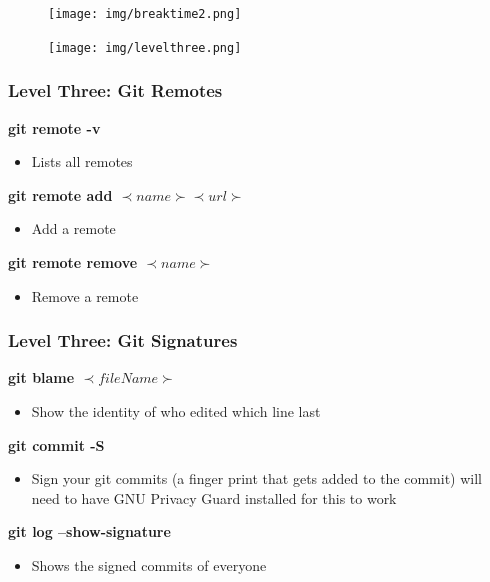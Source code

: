 \documentclass{beamer}
\begin{document}
\begin{frame}
	\begin{figure}[h]
	\centering
	\texttt{[image: img/breaktime2.png]} 
	\end{figure}
\end{frame}

\begin{frame}
	\begin{figure}[h]
	\centering
	\texttt{[image: img/levelthree.png]} 
	\end{figure}
\end{frame}

\begin{frame}
	\frametitle{\textbf{Level Three: Git Remotes}}
	
	
	\textbf{git remote -v}
	\begin{itemize}
	\item Lists all remotes 
	\end{itemize}
	\vspace{0.25cm}

	\textbf{git remote add \(\prec name \succ  \prec url \succ\)}
	\begin{itemize}
	\item Add a remote 
	\end{itemize}
	\vspace{0.25cm}

	\textbf{git remote remove \(\prec name \succ\)}
	\begin{itemize}
	\item Remove a remote 
	\end{itemize}

\end{frame}

\begin{frame}
	\frametitle{\textbf{Level Three: Git Signatures}}

	\textbf{git blame \(\prec fileName \succ\)}
	\begin{itemize}
	\item Show the identity of who edited which line last
	\end{itemize}
	\vspace{0.25cm}

	\textbf{git commit -S}
	\begin{itemize}
	\item Sign your git commits (a finger print that gets added to the commit)
	will need to have GNU Privacy Guard installed for this to work 
	\end{itemize}
	\vspace{0.25cm}
	
	\textbf{git log --show-signature}
	\begin{itemize}
	\item Shows the signed commits of everyone 
	\end{itemize}
	\vspace{0.25cm}

\end{frame}
\end{document}
